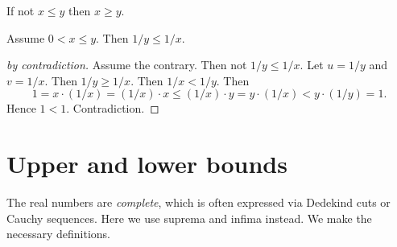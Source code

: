 \documentclass{article}
\begin{document}
\begin{forthel}
\begin{lemma}[syz]
If not $x \leq y$ then $x \geq y$.
\end{lemma}

\begin{proposition}
Assume $0 < x \leq y$.
Then $1/y \leq 1/x$.
\end{proposition}
\begin{proof}[by contradiction]
Assume the contrary.
Then not $1/y \leq 1/x$. Let $u = 1/y$ and $v = 1/x$.
Then $1/y \geq 1/x$.
Then $1/x < 1/y$.
Then
\[ 1 = x \cdot (1/x) = (1/x) \cdot x \leq (1/x) \cdot y =
y \cdot (1/x) < y \cdot (1/y) = 1. \]
Hence $1 < 1$. Contradiction.
\end{proof}

\end{forthel}


\section{Upper and lower bounds}

The real numbers are {\em complete}, which is often expressed
via Dedekind cuts or Cauchy sequences. Here
we use suprema and infima instead. We make the
necessary definitions.
\end{document}

